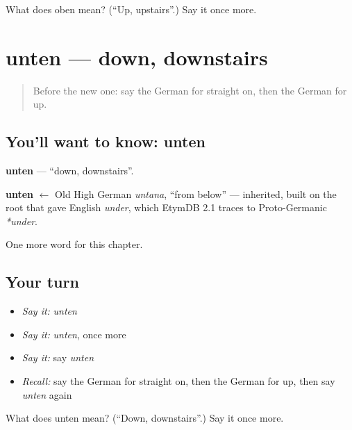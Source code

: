 \begin{tcolorbox}[breakable,colback=teal!4,colframe=teal!35!black,title={Before you move on}]
What does oben mean? (\textquotedblleft{}Up, upstairs\textquotedblright{}.) Say it once more.
\end{tcolorbox}
\section[unten]{unten — down, downstairs}

\label{lesson:GE-C109-unten}



\begin{quote}
Before the new one: say the German for straight on, then the German for up.
\end{quote}

\subsection*{You'll want to know: unten}
\textbf{unten} — \textquotedblleft{}down, downstairs\textquotedblright{}.

\begin{cousinweb}
\textbf{unten} $\leftarrow$ Old High German \emph{untana}, \textquotedblleft{}from below\textquotedblright{} — inherited, built on the root that gave English \emph{under}, which EtymDB 2.1 traces to Proto-Germanic \emph{*under}.
\end{cousinweb}

\begin{grammarlens}[title={What you've built}]
One more word for this chapter.
\end{grammarlens}

\subsection*{Your turn}
\begin{itemize}
\raggedright
  \item \emph{Say it:} \emph{unten}
  \item \emph{Say it:} \emph{unten}, once more
  \item \emph{Say it:} say \emph{unten}
  \item \emph{Recall:} say the German for straight on, then the German for up, then say \emph{unten} again
\end{itemize}

\begin{tcolorbox}[breakable,colback=teal!4,colframe=teal!35!black,title={Before you move on}]
What does unten mean? (\textquotedblleft{}Down, downstairs\textquotedblright{}.) Say it once more.
\end{tcolorbox}
